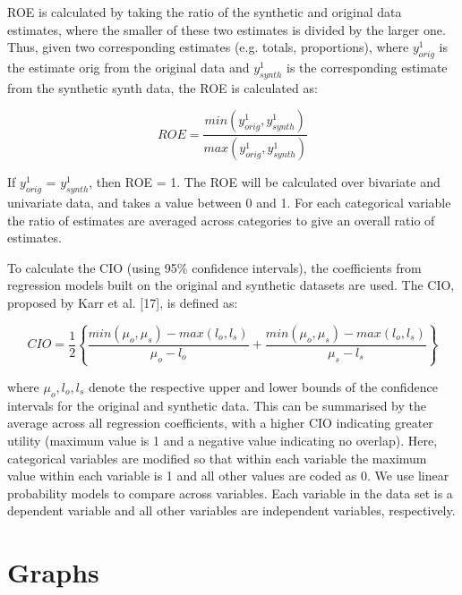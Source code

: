 \documentclass[12pt]{article}
\begin{document}
ROE is calculated by taking the ratio of the synthetic and original data estimates, where the smaller of these two estimates is divided by the larger one. Thus, given two corresponding estimates (e.g. totals, proportions), where $y^1_{orig}$ is the estimate orig from the original data and $y^1_{synth}$ is the corresponding estimate from the synthetic synth data, the ROE is calculated as:

\begin{equation}
    ROE = \frac{min(y^1_{orig},y^1_{synth})}{max(y^1_{orig},y^1_{synth})}
\end{equation}

If $y^1_{orig}$ = $y^1_{synth}$, then ROE = 1.  The ROE will be calculated over bivariate and univariate data, and takes a value between 0 and 1. For each categorical variable the ratio of estimates are averaged across categories to give an overall ratio of estimates.

To calculate the CIO (using 95\% confidence intervals), the coefficients from regression models built on the original and synthetic datasets are used. The CIO, proposed by Karr et al. [17], is defined as:

\begin{equation}
    CIO = \frac{1}{2}\left\{\frac{min(\mu_o,\mu_s)-max(l_o,l_s)}{\mu_o - l_o} + \frac{min(\mu_o,\mu_s)-max(l_o,l_s)}{\mu_s - l_s}\right\}
\end{equation}

where $\mu_o, l_o, l_s$ denote the respective upper and lower bounds of the confidence intervals for the original and synthetic data. This can be summarised by the average across all regression coefficients, with a higher CIO indicating greater utility (maximum value is 1 and a negative value indicating no overlap).  Here, categorical variables are modified so that within each variable the maximum value within each variable is 1 and all other values are coded as 0.  We use linear probability models to compare across variables.  Each variable in the data set is a dependent variable and all other variables are independent variables, respectively.

\clearpage
\section{Graphs}
\end{document}
